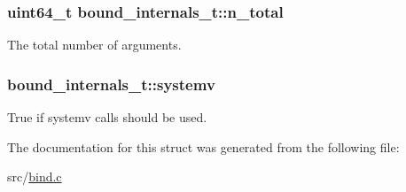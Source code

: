 \subsubsection[{\texorpdfstring{n\+\_\+total}{n_total}}]{\setlength{\rightskip}{0pt plus 5cm}uint64\+\_\+t bound\+\_\+internals\+\_\+t\+::n\+\_\+total}\hypertarget{structbound__internals__t_a804e2e3c6b4c0ca1814c6884ed0bd161}{}\label{structbound__internals__t_a804e2e3c6b4c0ca1814c6884ed0bd161}


The total number of arguments. 

\subsubsection[{\texorpdfstring{systemv}{systemv}}]{ bound\+\_\+internals\+\_\+t\+::systemv}\hypertarget{structbound__internals__t_af4af2491e60d6cda5a3bde0091d8b5c0}{}\label{structbound__internals__t_af4af2491e60d6cda5a3bde0091d8b5c0}


True if systemv calls should be used. 



The documentation for this struct was generated from the following file\+:\begin{DoxyCompactItemize}
\item 
src/\hyperlink{bind_8c}{bind.\+c}\end{DoxyCompactItemize}
